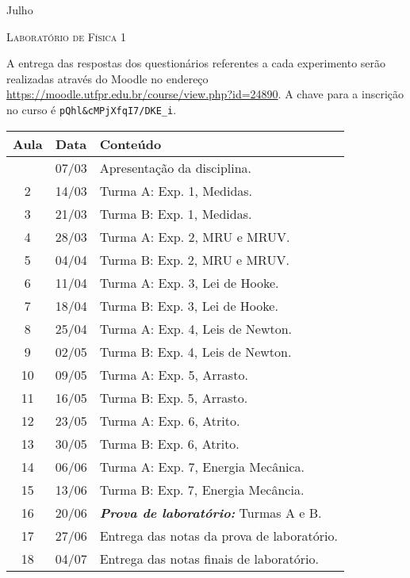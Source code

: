 %
\begin{marginfigure}
    \centering
    Julho\\
\end{marginfigure}
\vspace{1cm}
\begin{center}
\Large\textsc{Laboratório de Física 1}
\end{center}

A entrega das respostas dos questionários referentes a cada experimento serão realizadas através do Moodle no endereço \url{https://moodle.utfpr.edu.br/course/view.php?id=24890}. A chave para a inscrição no curso é \verb|pQhl&cMPjXfqI7/DKE_i|.
\begin{center}
\begin{longtable}{ccp{70mm}}
\toprule
Aula & Data & Conteúdo \\
\midrule
\endhead
\bottomrule
\endfoot
 1 & 07/03 & Apresentação da disciplina. \\
 2 & 14/03 & Turma A: Exp. 1, Medidas. \\
 3 & 21/03 & Turma B: Exp. 1, Medidas. \\
 4 & 28/03 & Turma A: Exp. 2, MRU e MRUV. \\ 
 5 & 04/04 & Turma B: Exp. 2, MRU e MRUV. \\
 6 & 11/04 & Turma A: Exp. 3, Lei de Hooke. \\
 7 & 18/04 & Turma B: Exp. 3, Lei de Hooke. \\
 8 & 25/04 & Turma A: Exp. 4, Leis de Newton. \\
 9 & 02/05 & Turma B: Exp. 4, Leis de Newton. \\
10 & 09/05 & Turma A: Exp. 5, Arrasto. \\
11 & 16/05 & Turma B: Exp. 5, Arrasto. \\
12 & 23/05 & Turma A: Exp. 6, Atrito. \\
13 & 30/05 & Turma B: Exp. 6, Atrito. \\
14 & 06/06 & Turma A: Exp. 7, Energia Mecânica. \\
15 & 13/06 & Turma B: Exp. 7, Energia Mecância. \\
16 & 20/06 & \textbf{\textit{Prova de laboratório:}} Turmas A e B. \\
17 & 27/06 & Entrega das notas da prova de laboratório. \\
18 & 04/07 & Entrega das notas finais de laboratório.
\end{longtable}
\end{center}


